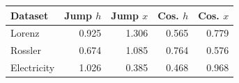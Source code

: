 \begin{tabular}{lrrrr}
\toprule
Dataset & Jump $h$ & Jump $x$ & Cos. $h$ & Cos. $x$ \\
\midrule
Lorenz & 0.925 & 1.306 & 0.565 & 0.779 \\
Rossler & 0.674 & 1.085 & 0.764 & 0.576 \\
Electricity & 1.026 & 0.385 & 0.468 & 0.968 \\
\bottomrule
\end{tabular}
